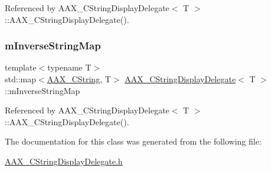 Referenced by A\+A\+X\+\_\+\+C\+String\+Display\+Delegate$<$ T $>$\+::\+A\+A\+X\+\_\+\+C\+String\+Display\+Delegate().

\mbox{\label{a01581_a388606665c60b57c16152b0424c54e2e}} 
\subsubsection{\texorpdfstring{mInverseStringMap}{mInverseStringMap}}
{\footnotesize\ttfamily template$<$typename T$>$ \\
std\+::map$<$\mbox{\hyperlink{a01573}{A\+A\+X\+\_\+\+C\+String}}, T$>$ \mbox{\hyperlink{a01581}{A\+A\+X\+\_\+\+C\+String\+Display\+Delegate}}$<$ T $>$\+::m\+Inverse\+String\+Map\hspace{0.3cm}{\ttfamily [protected]}}



Referenced by A\+A\+X\+\_\+\+C\+String\+Display\+Delegate$<$ T $>$\+::\+A\+A\+X\+\_\+\+C\+String\+Display\+Delegate().



The documentation for this class was generated from the following file\+:\begin{DoxyCompactItemize}
\item 
\mbox{\hyperlink{a00479}{A\+A\+X\+\_\+\+C\+String\+Display\+Delegate.\+h}}\end{DoxyCompactItemize}
